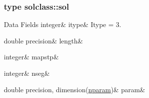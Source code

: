 \subsubsection{type solclass\+::sol}
\begin{DoxyFields}{Data Fields}
\mbox{\label{namespacesolclass_ae34e01b972a2658f3ff55fccc3f6b99a}} 
integer&
itype&
Itype = 3. \\
\hline

\mbox{\label{namespacesolclass_a66fe4253293f305d51d6d7db753bb2c2}} 
double precision&
length&
\\
\hline

\mbox{\label{namespacesolclass_a3821a5713cb3e0e9ae5359b42644b860}} 
integer&
mapstp&
\\
\hline

\mbox{\label{namespacesolclass_a4e0b71eae9d2072fd83b1a4e524da7fc}} 
integer&
nseg&
\\
\hline

\mbox{\label{namespacesolclass_a70efaac352dbf744000a92effd3d814b}} 
double precision, dimension(\mbox{\hyperlink{namespacesolclass_abb5af39a08a5ff2cbe713621b2727eaf}{nparam}})&
param&
\\
\hline

\end{DoxyFields}
